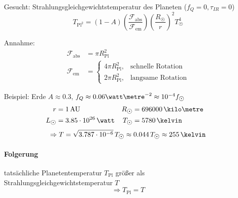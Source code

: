 Gesucht: Strahlungsgleichgewichtstemperatur des Planeten ($f_Q = 0, \tau_{IR} = 0$)
\[ \boxed{T_{\mathrm{Pl}^2} = (1 - A) \left(\frac{\mathcal{F}_{\mathrm{abs}}}{\mathcal{F}_{\mathrm{em}}}\right) \left(\frac{R_{\astrosun}}{r}\right)^2 T_{\astrosun}^4} \]

Annahme:
\begin{align*}
    \mathcal F_{\mathrm{abs}} &= \pi R_{\mathrm{Pl}}^2 \\
    \mathcal F_{\mathrm{em}} &= \begin{cases}
        4 \pi R_{\mathrm{Pl}}^2, & \text{schnelle Rotation} \\
        2 \pi R_{\mathrm{Pl}}^2, & \text{langsame Rotation}
    \end{cases}
\end{align*}

Beispiel: Erde $A \approx 0.3$, $f_Q \approx 0.06 \watt\metre^{-2} \approx 10^{-4} f_{\astrosun}$
\begin{align*}
    r &= 1\,\mathrm{AU} & R_{\astrosun} &= 696000\,\kilo\metre & \\
    L_{\astrosun} &= 3.85 \cdot 10^{26}\,\watt & T_{\astrosun} &= 5780\,\kelvin
\end{align*}
\[ \Rightarrow T = \sqrt{3.787 \cdot 10^{-6}}\,T_{\astrosun} \approx 0.044\,T_{\astrosun} \approx 255\,\kelvin \]

\paragraph{Folgerung} tatsächliche Planetentemperatur $T_{\mathrm{Pl}}$ größer
als Strahlungsgleichgewichtstemperatur $T$
\[ \Rightarrow \boxed{T_{\mathrm{Pl}} = T} \]
